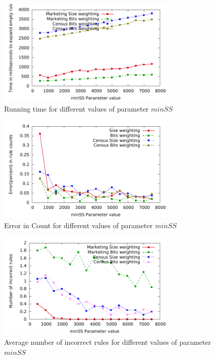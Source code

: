 \begin{figure}
\hspace{-20pt}
  \includegraphics[height=2in]{graphs/minSS_speed.pdf}%
\vspace{-5pt}
  \caption{Running time for different values of parameter $minSS$ \label{fig:minSS_speed}}
\vspace{-20pt}
\end{figure}

\begin{figure}
\hspace{-20pt}
  \includegraphics[height=2in]{graphs/minSS_error_percent.pdf}%
\vspace{-5pt}
  \caption{Error in Count for different values of parameter $minSS$ \label{fig:minSS_error_percent}}
\vspace{-20pt}
\end{figure}

\begin{figure}
\hspace{-20pt}
  \includegraphics[height=2in]{graphs/minSS_error_rule.pdf}%
\vspace{-5pt}
\caption{Average number of incorrect rules for different values of parameter $minSS$ \label{fig:minSS_error_rule}}
\vspace{-20pt}
\end{figure}


